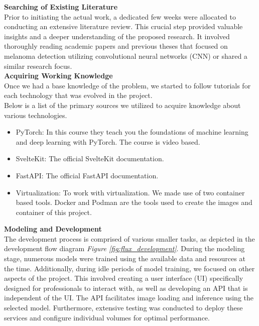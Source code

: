 \vspace{0.5cm}
\textbf{Searching of Existing Literature} \\

Prior to initiating the actual work, a dedicated few weeks were allocated to conducting an extensive literature review. This crucial step provided valuable insights and a deeper understanding of the proposed research. It involved thoroughly reading academic papers and previous theses that focused on melanoma detection utilizing convolutional neural networks (CNN) or shared a similar research focus. \\

\vspace{0.5cm}
\textbf{Acquiring Working Knowledge} \\

Once we had a base knowledge of the problem,
we started to follow tutorials for each technology that was evolved in the project. \\

Below is a list of the primary sources we utilized to acquire knowledge about various technologies. \\

\begin{itemize}
    \item PyTorch: \cite{LearnPyTorch} In this course they teach you the foundations of machine learning and deep learning with PyTorch. The course is video based.

    \item SvelteKit: \cite{LearnSvelteKit} The official SvelteKit documentation.

    \item FastAPI: \cite{LearnFastAPI} The official FastAPI documentation.

    \item Virtualization: To work with virtualization. We made use of two container based tools. Docker \cite{LearnDocker} and Podman \cite{LearnPodman} are the tools used to create the images and container of this project.
\end{itemize}

\vspace{0.5cm}
\textbf{Modeling and Development} \\

The development process is comprised of various smaller tasks, as depicted in the development
flow diagram \textit{Figure \ref{fig:flux_development}}.
During the modeling stage, numerous models were trained using the available data and resources at the time.
Additionally, during idle periods of model training,
we focused on other aspects of the project.
This involved creating a user interface (UI) specifically designed for professionals to interact with, as well as developing an API that is independent of the UI. The API facilitates image loading and inference using the selected model. Furthermore, extensive testing was conducted to deploy these services and configure individual volumes for optimal performance. \\

